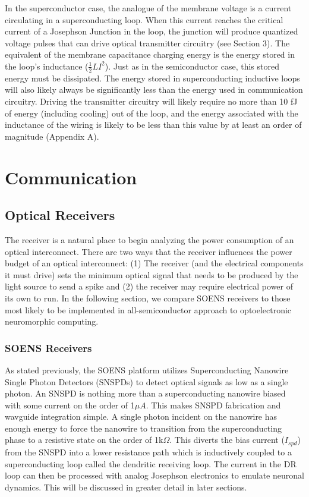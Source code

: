 \documentclass{article}
\begin{document}
In the superconductor case, the analogue of the membrane voltage is a current circulating in a superconducting loop. When this current reaches the critical current of a Josephson Junction in the loop, the junction will produce quantized voltage pulses that can drive optical transmitter circuitry (see Section 3). The equivalent of the membrane capacitance charging energy is the energy stored in the loop's inductance ($\frac{1}{2}LI^2$). Just as in the semiconductor case, this stored energy must be dissipated. The energy stored in superconducting inductive loops will also likely always be significantly less than the energy used in communication circuitry. Driving the transmitter circuitry will likely require no more than 10 fJ of energy (including cooling) out of the loop, and the energy associated with the inductance of the wiring is likely to be less than this value by at least an order of magnitude (Appendix A).

\section{Communication}
\subsection{Optical Receivers}
\quad \quad The receiver is a natural place to begin analyzing the power consumption of an optical interconnect. There are two ways that the receiver influences the power budget of an optical interconnect: (1) The receiver (and the electrical components it must drive) sets the minimum optical signal that needs to be produced by the light source to send a spike and (2) the receiver may require electrical power of its own to run. In the following section, we compare SOENS receivers \cite{shainline2019superconducting} to those most likely to be implemented in all-semiconductor approach to optoelectronic neuromorphic computing.

\subsubsection{SOENS Receivers}
\quad \quad As stated previously, the SOENS platform utilizes Superconducting Nanowire Single Photon Detectors (SNSPDs) to detect optical signals as low as a single photon. An SNSPD is nothing more than a superconducting nanowire biased with some current on the order of 1$\mu A$. This makes SNSPD fabrication and wavguide integration simple. A single photon incident on the nanowire has enough energy to force the nanowire to transition from the superconducting phase to a resistive state on the order of 1k$\Omega$. This diverts the bias current ($I_{spd}$) from the SNSPD into a lower resistance path which is inductively coupled to a superconducting loop called the dendritic receiving loop. The current in the DR loop can then be processed with analog Josephson electronics to emulate neuronal dynamics. This will be discussed in greater detail in later sections.
\end{document}
